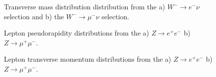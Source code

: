 \begin{figure}[h]
\begin{minipage}[h]{0.49\linewidth}
\end{minipage}
\hfill
\begin{minipage}[h]{0.49\linewidth}
\end{minipage}
\caption{Transverse mass distribution distribution from the a) $W^{-} \to e^{-} \nu$ selection and  b) the $W^{-} \to \mu^{-} \nu$ selection.}
\label{ris:WlnumtWM}
\end{figure}


\begin{figure}[h]
\begin{minipage}[h]{0.49\linewidth}
\end{minipage}
\hfill
\begin{minipage}[h]{0.49\linewidth}
\end{minipage}
\caption{ Lepton pseudorapidity distributions from the a) $Z\to e^{+}e^{-}$ b) $Z\to \mu^{+}\mu^{-}$.}
\label{ris:Zll}
\end{figure}

\begin{figure}[h]
\begin{minipage}[h]{0.49\linewidth}
\end{minipage}
\hfill
\begin{minipage}[h]{0.49\linewidth}
\end{minipage}
\caption{Lepton transverse momentum distributions from the a) $Z\to e^{+}e^{-}$ b) $Z\to \mu^{+}\mu^{-}$.}

\end{figure}

